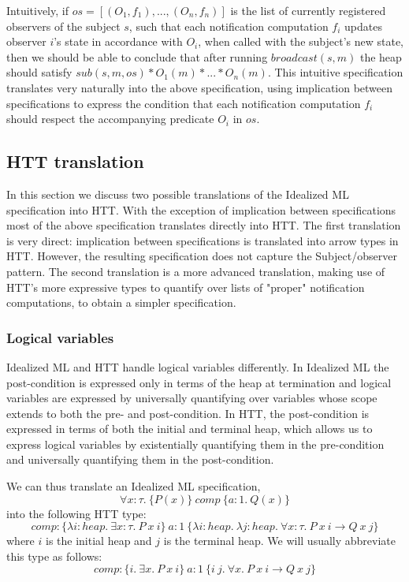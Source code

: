 \documentclass[a4paper,english]{article}
\newcommand{\HEAP}[0]{heap}
\begin{document}
Intuitively, if $os = [(O_1, f_1), ..., (O_n, f_n)]$ is the list of currently
registered observers of the subject $s$, such that each notification
computation $f_i$ updates observer $i$'s state in accordance with $O_i$, when
called with the subject's new state, then we should be able to conclude that
after running $broadcast(s, m)$ the heap should satisfy $sub(s, m, os) * O_1(m)
* ...  * O_n(m)$. This intuitive specification translates very naturally into
the above specification, using implication between specifications to express
the condition that each notification computation $f_i$ should respect the
accompanying predicate $O_i$ in $os$. 

\subsection{HTT translation}

In this section we discuss two possible translations of the Idealized ML
specification into HTT. With the exception of implication between
specifications most of the above specification translates directly into HTT.
The first translation is very direct: implication between specifications is
translated into arrow types in HTT. However, the resulting specification does
not capture the Subject/observer pattern. The second translation is a more
advanced translation, making use of HTT's more expressive types to quantify
over lists of "proper" notification computations, to obtain a simpler
specification.  

\subsubsection{Logical variables}

Idealized ML and HTT handle logical variables differently. In Idealized ML the
post-condition is expressed only in terms of the heap at termination and
logical variables are expressed by universally quantifying over variables whose
scope extends to both the pre- and post-condition. In HTT, the post-condition
is expressed in terms of both the initial and terminal heap, which allows us to
express logical variables by existentially quantifying them in the
pre-condition and universally quantifying them in the post-condition.

We can thus translate an Idealized ML specification,
$$\forall x : \tau.\ \{ P(x) \}\ comp\ \{ a : 1.\ Q(x) \}$$
into the following HTT type:
$$comp : \{ \lambda i : \HEAP.\ \exists x : \tau.\ P\ x\ i \}\ a : 1\
\{ \lambda i : \HEAP.\ \lambda j : \HEAP.\ \forall x : \tau.\ P\ x\ i \rightarrow Q\ x\ j \}$$
where $i$ is the initial heap and $j$ is the terminal heap. We will usually abbreviate this type as follows:
$$comp : \{ i.\ \exists x.\ P\ x\ i \}\ a : 1\
\{ i\ j.\ \forall x.\ P\ x\ i \rightarrow Q\ x\ j \}$$
\end{document}
